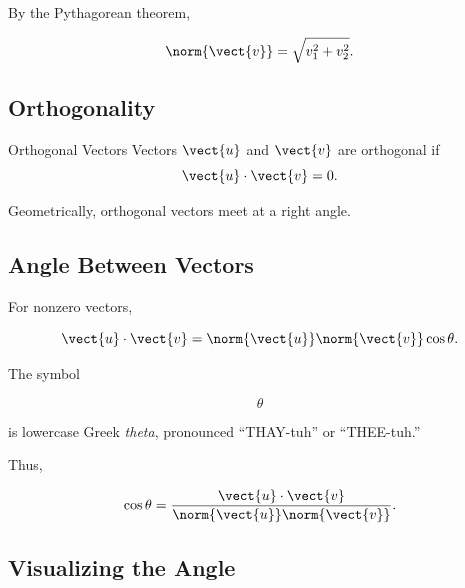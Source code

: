 By the Pythagorean theorem,

\[ \norm{\vect{v}}=\sqrt{v_1^2+v_2^2}. \]

\subsection{Orthogonality}
\label{subsec:orthogonality}

\begin{definitionbox}{Orthogonal Vectors}
Vectors \(\vect{u}\) and \(\vect{v}\) are orthogonal if
\[ \vect{u}\cdot\vect{v}=0. \]
\end{definitionbox}

Geometrically, orthogonal vectors meet at a right angle.

\begin{center}
\end{center}

\subsection{Angle Between Vectors}
\label{subsec:angle-between-vectors}

For nonzero vectors,

\[ \vect{u}\cdot\vect{v}
=\norm{\vect{u}}\norm{\vect{v}}\cos\theta. \]

The symbol

\[ \theta \]

is lowercase Greek \emph{theta}, pronounced ``THAY-tuh'' or ``THEE-tuh.''

Thus,

\[ \cos\theta=
\frac{\vect{u}\cdot\vect{v}}
{\norm{\vect{u}}\norm{\vect{v}}}. \]

\subsection{Visualizing the Angle}
\label{subsec:visual-vector-angle}

